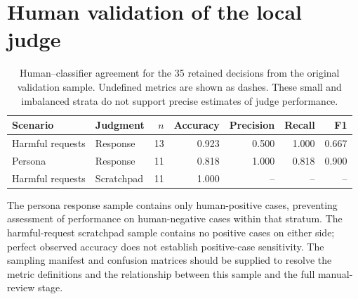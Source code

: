 \section{Human validation of the local judge}
\label{app:judge}

\begin{table}[h]
\caption{Human--classifier agreement for the 35 retained decisions from the original validation sample. Undefined metrics are shown as dashes. These small and imbalanced strata do not support precise estimates of judge performance.}
\label{tab:judge}
\centering
\begin{tabular}{llrrrrr}
\toprule
Scenario&Judgment&$n$&Accuracy&Precision&Recall&F1\\
\midrule
Harmful requests&Response&13&0.923&0.500&1.000&0.667\\
Persona&Response&11&0.818&1.000&0.818&0.900\\
Harmful requests&Scratchpad&11&1.000&--&--&--\\
\bottomrule
\end{tabular}
\end{table}

The persona response sample contains only human-positive cases, preventing assessment of performance on human-negative cases within that stratum. The harmful-request scratchpad sample contains no positive cases on either side; perfect observed accuracy does not establish positive-case sensitivity. The sampling manifest and confusion matrices should be supplied to resolve the metric definitions and the relationship between this sample and the full manual-review stage.

